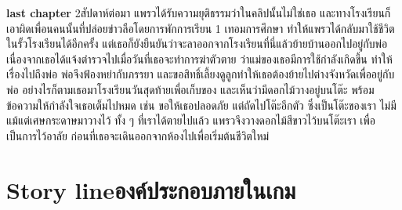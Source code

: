\textbf{last chapter}
2สัปดาห์ต่อมา แพรวได้รับความยุติธรรมว่าในคลิปนั้นไม่ใช่เธอ และทางโรงเรียนก็เอาผิดเพื่อนคนนั้นที่ปล่อยข่าวลือโดยการพักการเรียน 1 เทอมการศึกษา ทำให้แพรวได้กลับมาใช้ชีวิตในรั้วโรงเรียนได้อีกครั้ง แต่เธอก็ยังยืนยันว่าจะลาออกจากโรงเรียนที่นี่แล้วย้ายบ้านออกไปอยู่กับพ่อ เนื่องจากเธอได้แจ้งตำรวจไปเมื่อวันที่เธอจะทำการฆ่าตัวตาย ว่าแม่ของเธอมีการใช้กำลังเกิดขึ้น ทำให้เรื่องไปถึงพ่อ พ่อจึงฟ้องหย่ากับภรรยา และขอสิทธิ์เลี้ยงดูลูกทำให้เธอต้องย้ายไปต่างจังหวัดเพื่ออยู่กับพ่อ อย่างไรก็ตามเธอมาโรงเรียนวันสุดท้ายเพื่อเก็บของ และเห็นว่ามีดอกไม้วางอยู่บนโต๊ะ พร้อมข้อความให้กำลังใจเธอเต็มไปหมด เช่น ขอให้เธอปลอดภัย แต่ถัดไปโต๊ะอีกตัว ซึ่งเป็นโต๊ะของเรา ไม่มีแม้แต่เศษกระดาษมาวางไว้ ทั้ง ๆ ที่เราได้ตายไปแล้ว แพรวจึงวางดอกไม้สีขาวไว้บนโต๊ะเรา เพื่อเป็นการไว้อาลัย ก่อนที่เธอจะเดินออกจากห้องไปเพื่อเริ่มต้นชีวิตใหม่


\section{\ifenglish Story line\else องค์ประกอบภายในเกม\fi }
